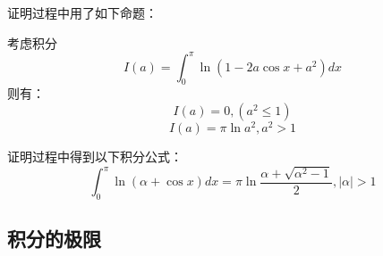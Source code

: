 \documentclass[lang=cn,newtx,10pt,scheme=chinese]{elegantbook}
\begin{document}
\begin{note}
    证明过程中用了如下命题：
    \begin{proposition}\label{Important Integrals Involving Parameters_1}
           考虑积分 $$I(a) = \int_{0}^{\pi} \ln(1-2a\cos x + a^2)dx$$则有：
            $$ I(a) = 0, (a^2 \le 1) $$
            $$ I(a) = \pi \ln a^2, a^2 > 1 $$
    \end{proposition}

    证明过程中得到以下积分公式：
    \begin{equation*}
        \boxed{\int_{0}^{\pi} \ln(\alpha + \cos x) dx = \pi \ln \frac{\alpha + \sqrt{\alpha^2 - 1}}{2},|\alpha|>1}
    \end{equation*}
\end{note}

\subsection{积分的极限}
\end{document}
